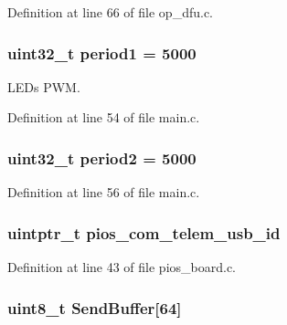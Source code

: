 \-Definition at line 66 of file op\-\_\-dfu.\-c.

\hypertarget{group___revo_mini_b_l_gabe751b3d399e053031c1e3db20b6b071}{
\subsubsection[{period1}]{\setlength{\rightskip}{0pt plus 5cm}uint32\-\_\-t {\bf period1} = 5000}}\label{group___revo_mini_b_l_gabe751b3d399e053031c1e3db20b6b071}


\-L\-E\-Ds \-P\-W\-M. 



\-Definition at line 54 of file main.\-c.

\hypertarget{group___revo_mini_b_l_gadf8633b43922fbf4f1d86981daf74ccc}{
\subsubsection[{period2}]{\setlength{\rightskip}{0pt plus 5cm}uint32\-\_\-t {\bf period2} = 5000}}\label{group___revo_mini_b_l_gadf8633b43922fbf4f1d86981daf74ccc}


\-Definition at line 56 of file main.\-c.

\hypertarget{group___revo_mini_b_l_ga513cc36d72b76de2fcb75ff233a79a4a}{
\subsubsection[{pios\-\_\-com\-\_\-telem\-\_\-usb\-\_\-id}]{\setlength{\rightskip}{0pt plus 5cm}uintptr\-\_\-t {\bf pios\-\_\-com\-\_\-telem\-\_\-usb\-\_\-id}}}\label{group___revo_mini_b_l_ga513cc36d72b76de2fcb75ff233a79a4a}


\-Definition at line 43 of file pios\-\_\-board.\-c.

\hypertarget{group___revo_mini_b_l_ga8f7836468d53f1bf54ab28474ae14624}{
\subsubsection[{\-Send\-Buffer}]{\setlength{\rightskip}{0pt plus 5cm}uint8\-\_\-t {\bf \-Send\-Buffer}\mbox{[}64\mbox{]}}}\label{group___revo_mini_b_l_ga8f7836468d53f1bf54ab28474ae14624}


